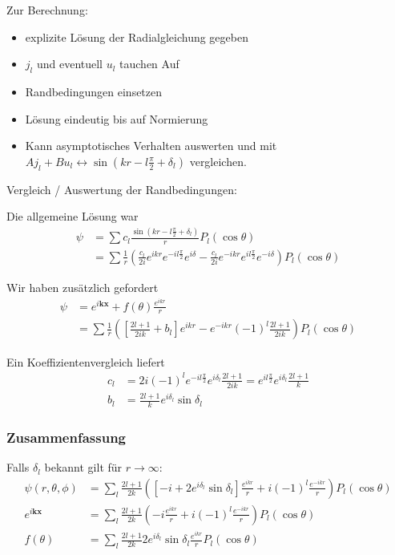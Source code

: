 \documentclass[11pt,a4paper]{report}
\begin{document}
Zur Berechnung:
\begin{itemize}
    \item explizite Lösung der Radialgleichung gegeben
    \item $j_l$ und eventuell $u_l$ tauchen Auf
    \item Randbedingungen einsetzen
    \item Lösung eindeutig bis auf Normierung
    \item Kann asymptotisches Verhalten auswerten und mit $A j_l + B u_l \leftrightarrow \sin \left( k r - l \frac{\pi}{2} + \delta_l\right)$ vergleichen.
\end{itemize}

Vergleich / Auswertung der Randbedingungen:

Die allgemeine Lösung war
\begin{align*}
    \psi &= \sum c_l \frac{\sin \left(k r - l \frac{\pi}{2} + \delta_l \right)}{r} P_l(\cos \theta) \\
    &= \sum \frac{1}{r} \left(\frac{c_l}{2 i} e^{i k r} e^{-i l \frac{\pi}{2}} e^{i \delta} - \frac{c_l}{2 i} e^{-i k r} e^{i l \frac{\pi}{2}} e^{-i \delta}\right) P_l (\cos \theta)     
\end{align*}

Wir haben zusätzlich gefordert
\begin{align*}
    \psi &= e^{i \mathbf{k} \mathbf{x}} + f(\theta) \frac{e^{i k r}}{r} \\
    &= \sum \frac{1}{r} \left(\left[ \frac{2 l + 1}{2 i k} + b_l \right] e^{i k r} - e^{-i k r} (-1)^l \frac{2 l + 1} {2 i k}\right) P_l(\cos \theta)
\end{align*}

Ein Koeffizientenvergleich liefert 
\begin{align*}
    c_l &= 2 i (-1)^l e^{-i l \frac{\pi}{2}} e^{i \delta_l} \frac{2 l + 1}{2 i k} = e^{i l \frac{\pi}{2}} e^{i \delta_l} \frac{2 l + 1}{k} \\
    b_l &= \frac{2 l + 1}{k} e^{i \delta_l} \sin \delta_l
\end{align*}

\subsubsection{Zusammenfassung}

Falls $\delta_l$ bekannt gilt für $r \rightarrow \infty$:
\begin{align*}
    \psi(r, \theta, \phi) &= \sum_l \frac{2 l + 1}{2 k} \left( \left[ -i + 2 e^{i \delta_l} \sin \delta_l \right] \frac{e^{i k r}}{r} + i (-1)^l \frac{e^{-i k r}}{r}\right) P_l(\cos \theta) \\
    e^{i \mathbf{k} \mathbf{x}} &= \sum_l \frac{2 l + 1}{2 k} \left( -i \frac{e^{i k r}}{r} + i (-1)^l \frac{e^{-i k r}}{r}\right) P_l(\cos \theta) \\
    f(\theta) &= \sum_l \frac{2 l + 1}{2 k} 2 e^{i \delta_l} \sin \delta_l \frac{e^{i k r}}{r}  P_l(\cos \theta) 
\end{align*}
\end{document}

